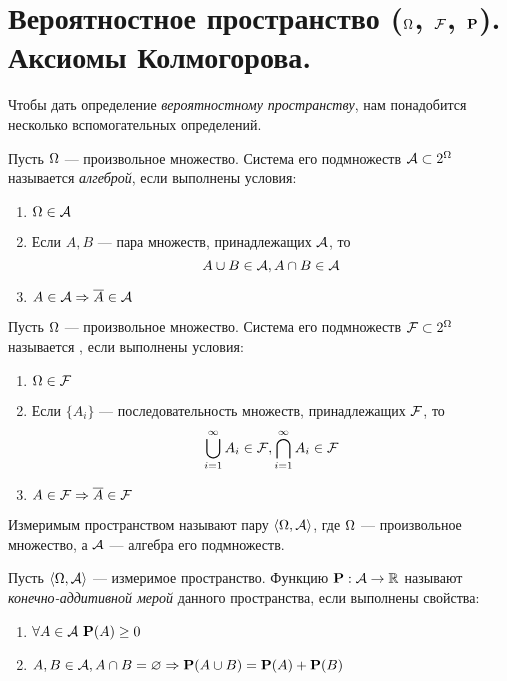 \section{Вероятностное пространство ($\Omega$, $\mathcal{F}$, $\mathbf{P}$). Аксиомы Колмогорова.}

Чтобы дать определение {\it вероятностному пространству}, нам понадобится несколько вспомогательных определений.

\begin{definition}[Алгебра]
	Пусть $\Omega$ --- произвольное множество. Система его подмножеств $\mathcal{A} \subset 2^{\Omega}$ называется {\it алгеброй}, если выполнены условия:
	\begin{enumerate}
		\item $\Omega \in \mathcal{A}$
		\item Если $A, B$ --- пара множеств, принадлежащих $\mathcal{A}$, то
			$$A \cup B \in \mathcal{A}, A \cap B \in \mathcal{A}$$
		\item $A \in \mathcal{A} \Rightarrow \overline{A} \in \mathcal{A}$
	\end{enumerate}
\end{definition}

\begin{definition}[\gmалгебра]
	Пусть $\Omega$ --- произвольное множество. Система его подмножеств $\mathcal{F} \subset 2^{\Omega}$ называется {\it {}}, если выполнены условия:
	\begin{enumerate}
		\item $\Omega \in \mathcal{F}$
		\item Если $\{A_i\}$ --- последовательность множеств, принадлежащих $\mathcal{F}$, то 
			$$\bigcup_{i=1}^{\infty} A_i \in \mathcal{F}, \bigcap_{i=1}^{\infty} A_i \in \mathcal{F}$$
		\item $A \in \mathcal{F} \Rightarrow \overline{A} \in \mathcal{F}$
	\end{enumerate}
\end{definition}

\begin{definition}
Измеримым пространством называют пару $\langle \Omega, \mathcal{A} \rangle$, где $\Omega$ --- произвольное множество, а $\mathcal{A}$ --- алгебра его подмножеств.
\end{definition}

\begin{definition}
	Пусть $\langle \Omega, \mathcal{A} \rangle$ --- измеримое пространство. Функцию $\mathbf{P} : \mathcal{A} \rightarrow \mathbb{R}$ называют {\it конечно-аддитивной мерой} данного пространства, если выполнены свойства:
	\begin{enumerate}
		\item $\forall A \in \mathcal{A} \ \mathbf{P}(A) \ge 0$
		\item $A, B \in \mathcal{A}, A \cap B = \varnothing \Rightarrow \mathbf{P}(A \cup B) = \mathbf{P}(A) + \mathbf{P}(B)$
	\end{enumerate}
\end{definition}

